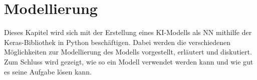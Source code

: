 \chapter{Modellierung}
\label{chap:Modellierung}
Dieses Kapitel wird sich mit der Erstellung eines \ac{KI}-Modells als \ac{NN} mithilfe der Keras-Bibliothek in Python beschäftigen. Dabei werden die verschiedenen Möglichkeiten
zur Modellierung des Modells vorgestellt, erläutert und diskutiert. Zum Schluss wird gezeigt, wie so ein Modell verwendet werden kann und wie gut es seine Aufgabe lösen kann.






